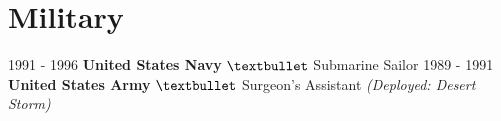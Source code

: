 \documentclass[letterpaper]{twentysecondcv} %
\begin{document}
\section{Military}
\begin{twenty} %
	\twentyitemshort
	{1991 - 1996}
	{\textbf{United States Navy} $\textbullet$ Submarine Sailor}
	\twentyitemshort
	{1989 - 1991}
	{\textbf{United States Army} $\textbullet$ Surgeon's Assistant \textit{(Deployed: Desert Storm)}}
\end{twenty}	
\end{document}
